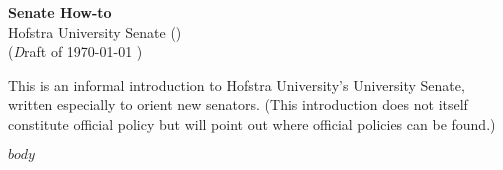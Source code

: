 \documentclass[12pt]{article}
\begin{document}
\thispagestyle{empty}



\begin{center}
  \textbf{\large Senate How-to} \\ Hofstra University Senate (\the\year) \\ ({\emph Draft of \today} )
\end{center}



\noindent This is an informal introduction to Hofstra University's University
Senate, written especially to orient new senators. (This introduction
does not itself constitute official policy but will point out where
official policies can be found.)



\begin{center}
\begin{minipage}[c]{4.25in} %
\tableofcontents
\end{minipage}
\end{center}



$body$
\end{document}
